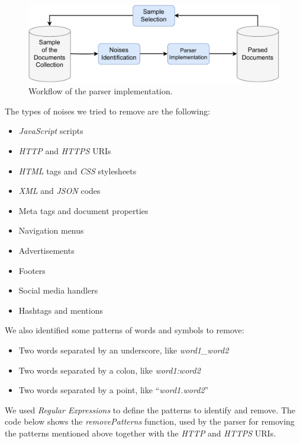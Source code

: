 \begin{figure}[!h]
    \centering
    \includegraphics[width=0.8\linewidth]{figure/Parser_implementation_workflow.pdf}
    \caption{Workflow of the parser implementation.}
    \label{fig:Parser_implementation_workflow}
\end{figure}

\newpage
The types of noises we tried to remove are the following:
\begin{itemize}
\item \textit{JavaScript} scripts
\item \textit{HTTP} and \textit{HTTPS} URIs
\item \textit{HTML} tags and \textit{CSS} stylesheets
\item \textit{XML} and \textit{JSON} codes
\item Meta tags and document properties
\item Navigation menus
\item Advertisements
\item Footers
\item Social media handlers
\item Hashtags and mentions
\end{itemize}
We also identified some patterns of words and symbols to remove:
\begin{itemize}
\item Two words separated by an underscore, like \textit{word1\_word2}
\item Two words separated by a colon, like \textit{word1:word2}
\item Two words separated by a point, like ``\textit{word1.word2}''
\end{itemize}
We used \textit{Regular Expressions} to define the patterns to identify and remove. The code below shows the \textit{removePatterns} function, used by the parser for removing the patterns mentioned above together with the \textit{HTTP} and \textit{HTTPS} URIs.
